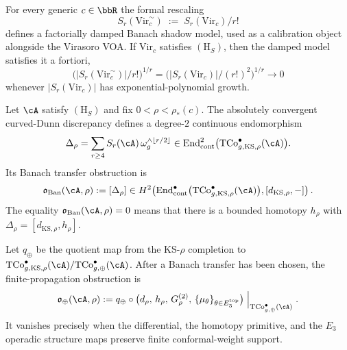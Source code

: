 \begin{example}
\label{ex:tempered-virasoro}
For every generic $c \in \bbR$ the formal rescaling
\[
 S_r(\mathrm{Vir}_c^{\sim})
 \;:=\;
 S_r(\mathrm{Vir}_c)/r!
\]
defines a factorially damped Banach shadow model, used as a
calibration object alongside the Virasoro VOA. If $\mathrm{Vir}_c$
satisfies $(\mathrm{H}_S)$, then the damped model satisfies it a
fortiori,
\[
 \bigl(\lvert S_r(\mathrm{Vir}_c^{\sim})\rvert/r!\bigr)^{1/r}
 =
 \bigl(\lvert S_r(\mathrm{Vir}_c)\rvert/(r!)^2\bigr)^{1/r}
 \longrightarrow 0
\]
whenever $\lvert S_r(\mathrm{Vir}_c)\rvert$ has
exponential-polynomial growth.
\end{example}

\begin{definition}
\label{def:banach-transfer-finite-propagation-obstruction}
Let $\cA$ satisfy $(\mathrm{H}_S)$ and fix
$0<\rho<\rho_*(c)$. The absolutely convergent curved-Dunn discrepancy
defines a degree-$2$ continuous endomorphism
\[
 \Delta_\rho
 =
 \sum_{r\ge4}S_r(\cA)\,
 \omega_g^{\wedge\lfloor r/2\rfloor}
 \in
 \operatorname{End}^2_{\mathrm{cont}}
 \bigl(\mathrm{TCo}^{\bullet}_{g,\mathrm{KS},\rho}(\cA)\bigr).
\]
Its Banach transfer obstruction is
\[
 \mathfrak{o}_{\mathrm{Ban}}(\cA,\rho)
 :=
 [\Delta_\rho]
 \in
 H^2\!\left(
 \operatorname{End}^{\bullet}_{\mathrm{cont}}
 \bigl(\mathrm{TCo}^{\bullet}_{g,\mathrm{KS},\rho}(\cA)\bigr),
 [d_{\mathrm{KS},\rho},-]\right).
\]
The equality
$\mathfrak{o}_{\mathrm{Ban}}(\cA,\rho)=0$ means that there is a
bounded homotopy $h_\rho$ with
$\Delta_\rho=[d_{\mathrm{KS},\rho},h_\rho]$.

Let $q_\oplus$ be the quotient map from the KS-$\rho$ completion to
$\mathrm{TCo}^{\bullet}_{g,\mathrm{KS},\rho}(\cA)/
\mathrm{TCo}^{\bullet}_{g,\oplus}(\cA)$. After a Banach transfer has
been chosen, the finite-propagation obstruction is
\[
 \mathfrak{o}_{\oplus}(\cA,\rho)
 :=
 q_\oplus \circ
 \bigl(d_{\rho},\,h_\rho,\,G^{(2)}_{\rho},\,
 \{\mu_\theta\}_{\theta\in E_3^{\mathrm{top}}}\bigr)
 \Bigm|_{\mathrm{TCo}^{\bullet}_{g,\oplus}(\cA)} .
\]
It vanishes precisely when the differential, the homotopy primitive,
and the $E_3$ operadic structure maps preserve finite
conformal-weight support.
\end{definition}

